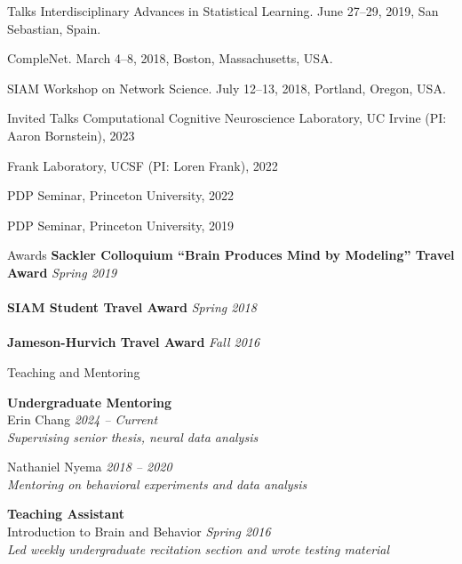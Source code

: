 \documentclass{resume} %
\begin{document}
\begin{rSection}{Talks}
Interdisciplinary Advances in Statistical Learning. June 27--29, 2019, San Sebastian, Spain.

CompleNet. March 4--8, 2018, Boston, Massachusetts, USA.

SIAM Workshop on Network Science. July 12--13, 2018, Portland, Oregon, USA.
\end{rSection}

\begin{rSection}{Invited Talks}
Computational Cognitive Neuroscience Laboratory, UC Irvine (PI: Aaron Bornstein), 2023

Frank Laboratory, UCSF (PI: Loren Frank), 2022

PDP Seminar, Princeton University, 2022

PDP Seminar, Princeton University, 2019

\end{rSection}

\begin{rSection}{Awards}
    \textbf{Sackler Colloquium ``Brain Produces Mind by Modeling'' Travel Award} \hfill \emph{Spring 2019} \\
    \\
    \textbf{SIAM Student Travel Award} \hfill \emph{Spring 2018} \\
    \\
    \textbf{Jameson-Hurvich Travel Award} \hfill \emph{Fall 2016} \\
\end{rSection}


\begin{rSection}{Teaching and Mentoring}

\textbf{Undergraduate Mentoring} \\
Erin Chang \hfill \emph{2024 -- Current} \\
\emph{Supervising senior thesis, neural data analysis}

Nathaniel Nyema \hfill \emph{2018 -- 2020} \\
\emph{Mentoring on behavioral experiments and data analysis}

\textbf{Teaching Assistant} \\
Introduction to Brain and Behavior \hfill \emph{Spring 2016} \\
\emph{Led weekly undergraduate recitation section and wrote testing material}

\end{rSection}
\end{document}
